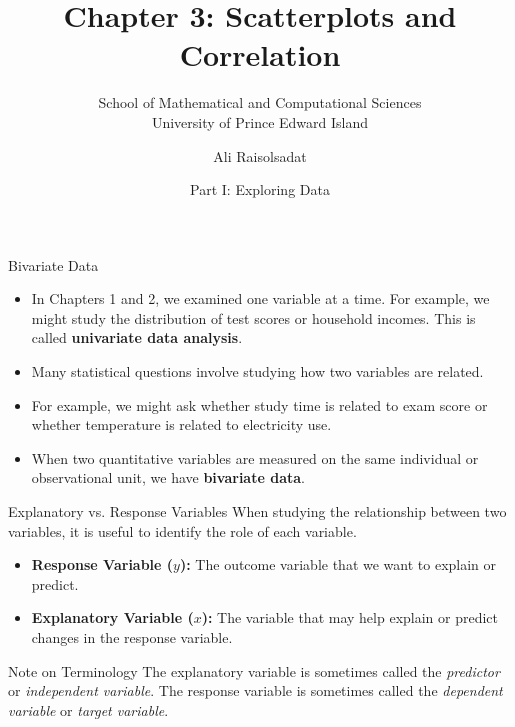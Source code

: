 \documentclass[aspectratio=169]{beamer}
\title[Chapter 3: Scatterplots \& Correlation]{\textbf{Chapter 3: Scatterplots and Correlation}}
\subtitle{School of Mathematical and Computational Sciences \\ University of Prince Edward Island}
\author{Ali Raisolsadat}
\date{Part I: Exploring Data}
\begin{document}

\begin{frame}
  \titlepage
\end{frame}

\begin{frame}{Bivariate Data}
\begin{itemize}
	\item In Chapters 1 and 2, we examined one variable at a time. For example, we might study the distribution of test scores or household incomes. This is called \textbf{univariate data analysis}.
	\item Many statistical questions involve studying how two variables are related.
	\item For example, we might ask whether study time is related to exam score or whether temperature is related to electricity use.
	\item When two quantitative variables are measured on the same individual or observational unit, we have \textbf{bivariate data}.
\end{itemize}
\end{frame}

\begin{frame}{Explanatory vs. Response Variables}
When studying the relationship between two variables, it is useful to identify the role of each variable.
\vspace{0.3cm}
\begin{itemize}
	\item \textbf{Response Variable ($y$):} The outcome variable that we want to explain or predict.
	\item \textbf{Explanatory Variable ($x$):} The variable that may help explain or predict changes in the response variable.
\end{itemize}
\vspace{0.3cm}
\begin{block}{Note on Terminology}
The explanatory variable is sometimes called the \emph{predictor} or \emph{independent variable}. The response variable is sometimes called the \emph{dependent variable} or \emph{target variable}.
\end{block}
\end{frame}
\end{document}

